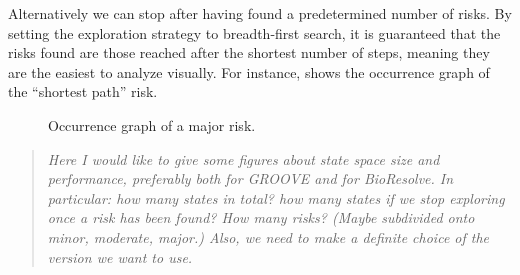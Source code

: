 Alternatively we can stop after having found a predetermined number of risks. By setting the exploration strategy to breadth-first search, it is guaranteed that the risks found are those reached after the shortest number of steps, meaning they are the easiest to analyze visually. For instance,  shows the occurrence graph of the ``shortest path'' risk.

\begin{figure}
\caption{Occurrence graph of a major risk.}
\label{fig:cmsb-occurrence}
\end{figure}

\begin{quote}\it
Here I would like to give some figures about state space size and performance, preferably both for GROOVE and for BioResolve. In particular: how many states in total? how many states if we stop exploring once a risk has been found? How many risks? (Maybe subdivided onto minor, moderate, major.) Also, we need to make a definite choice of the version we want to use.
\end{quote}



